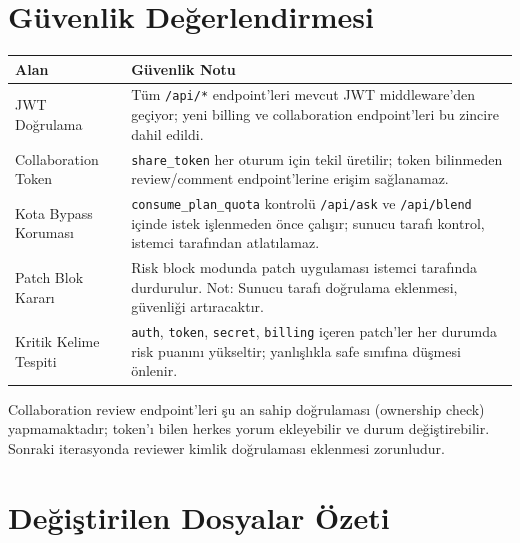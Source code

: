 \documentclass[11pt,a4paper]{article}
\begin{document}
\section{Güvenlik Değerlendirmesi}

\begin{tabularx}{\textwidth}{@{} L{3.5cm} X @{}}
\toprule
\textbf{Alan} & \textbf{Güvenlik Notu} \\
\midrule
JWT Doğrulama & Tüm \texttt{/api/*} endpoint'leri mevcut JWT middleware'den geçiyor; yeni billing ve collaboration endpoint'leri bu zincire dahil edildi. \\
\addlinespace
Collaboration Token & \texttt{share\_token} her oturum için tekil üretilir; token bilinmeden review/comment endpoint'lerine erişim sağlanamaz. \\
\addlinespace
Kota Bypass Koruması & \texttt{consume\_plan\_quota} kontrolü \texttt{/api/ask} ve \texttt{/api/blend} içinde istek işlenmeden önce çalışır; sunucu tarafı kontrol, istemci tarafından atlatılamaz. \\
\addlinespace
Patch Blok Kararı & Risk block modunda patch uygulaması istemci tarafında durdurulur. Not: Sunucu tarafı doğrulama eklenmesi, güvenliği artıracaktır. \\
\addlinespace
Kritik Kelime Tespiti & \texttt{auth}, \texttt{token}, \texttt{secret}, \texttt{billing} içeren patch'ler her durumda risk puanını yükseltir; yanlışlıkla safe sınıfına düşmesi önlenir. \\
\bottomrule
\end{tabularx}

\begin{warnbox}
Collaboration review endpoint'leri şu an sahip doğrulaması (ownership check) yapmamaktadır; token'ı bilen herkes yorum ekleyebilir ve durum değiştirebilir. Sonraki iterasyonda reviewer kimlik doğrulaması eklenmesi zorunludur.
\end{warnbox}

\section{Değiştirilen Dosyalar Özeti}
\end{document}
